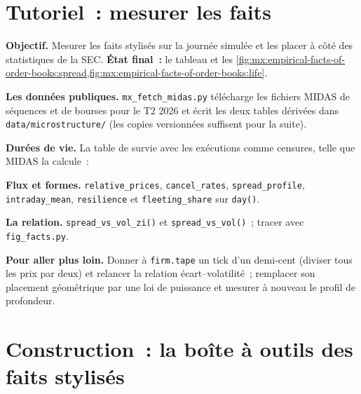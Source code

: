 \section{Tutoriel~: mesurer les faits}\label{tut:mx:empirical-facts-of-order-books:tut}

\begin{tutorial}
\textbf{Objectif.} Mesurer les faits stylisés sur la journée simulée et les placer à côté des statistiques de la SEC. \textbf{État final~:} le tableau et les
\cref{fig:mx:empirical-facts-of-order-books:spread,fig:mx:empirical-facts-of-order-books:life}.
\begin{tutsteps}
\item \textbf{Les données publiques.} \texttt{mx\_fetch\_midas.py} télécharge les fichiers MIDAS de séquences et de bourses pour le T2 2026 et écrit les deux tables dérivées dans
\texttt{data/microstructure/} (les copies versionnées suffisent pour la suite).
\item \textbf{Durées de vie.} La table de survie avec les exécutions comme censures, telle que MIDAS la calcule~:
\label{lst:mx:empirical-facts-of-order-books:life}
\item \textbf{Flux et formes.} \texttt{relative\_prices}, \texttt{cancel\_rates}, \texttt{spread\_profile}, \texttt{intraday\_mean}, \texttt{resilience}
et \texttt{fleeting\_share} sur \texttt{day()}.
\item \textbf{La relation.} \texttt{spread\_vs\_vol\_zi()} et \texttt{spread\_vs\_vol()}~; tracer avec \texttt{fig\_facts.py}.
\end{tutsteps}
\textbf{Pour aller plus loin.} Donner à \texttt{firm.tape} un tick d'un demi-cent (diviser tous les prix par deux) et relancer la relation écart--volatilité~; remplacer son placement géométrique
par une loi de puissance et mesurer à nouveau le profil de profondeur.
\end{tutorial}

\section{Construction~: la boîte à outils des faits stylisés}\label{bld:mx:empirical-facts-of-order-books:lobstats}


